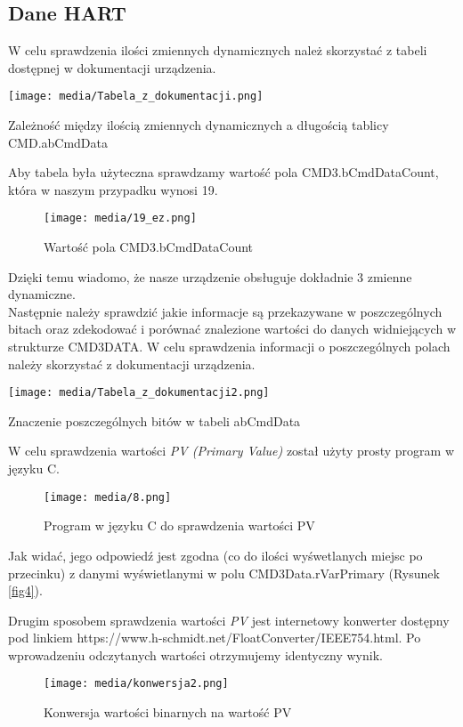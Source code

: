 \documentclass{article}
\begin{document}
\subsection{Dane HART}
W celu sprawdzenia ilości zmiennych dynamicznych należ skorzystać z  tabeli dostępnej w dokumentacji urządzenia. 
\begin{table}[H]
    \centering
    \texttt{[image: media/Tabela\_z\_dokumentacji.png]}
    \caption{Zależność między ilością zmiennych dynamicznych a długością tablicy CMD.abCmdData}
\end{table}
Aby tabela była użyteczna sprawdzamy wartość pola CMD3.bCmdDataCount, która w naszym przypadku wynosi 19.
\begin{figure}[H]
    \centering
    \texttt{[image: media/19\_ez.png]}
    \caption{Wartość pola CMD3.bCmdDataCount}
\end{figure}
Dzięki temu wiadomo, że nasze urządzenie obsługuje dokładnie 3 zmienne dynamiczne.\\

Następnie należy sprawdzić jakie informacje są przekazywane w poszczególnych bitach oraz zdekodować i porównać znalezione wartości do danych widniejących w strukturze CMD3DATA. W celu sprawdzenia informacji o poszczególnych polach należy skorzystać z dokumentacji urządzenia.
\begin{table}[H]
    \centering
    \texttt{[image: media/Tabela\_z\_dokumentacji2.png]}
    \caption{Znaczenie poszczególnych bitów w tabeli abCmdData}
\end{table}
W celu sprawdzenia wartości \textit{PV (Primary Value)} został użyty prosty program w języku C. 
\begin{figure}[H]
    \centering
    \texttt{[image: media/8.png]}
    \caption{Program w języku C do sprawdzenia wartości PV}
\end{figure}
Jak widać, jego odpowiedź jest zgodna (co do ilości wyśwetlanych miejsc po przecinku) z danymi wyświetlanymi w polu CMD3Data.rVarPrimary (Rysunek \ref{fig4}).

Drugim sposobem sprawdzenia wartości \textit{PV} jest internetowy konwerter dostępny pod linkiem https://www.h-schmidt.net/FloatConverter/IEEE754.html. Po wprowadzeniu odczytanych wartości otrzymujemy identyczny wynik. 
\begin{figure}[H]
    \centering
    \texttt{[image: media/konwersja2.png]}
    \caption{Konwersja wartości binarnych na wartość PV}
\end{figure}
\end{document}
